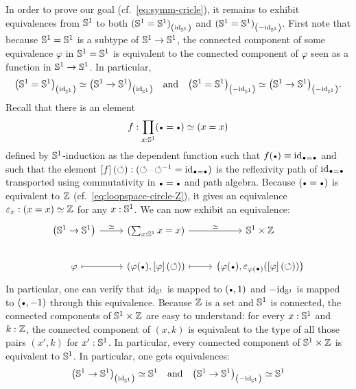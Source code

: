\documentclass[english,a4]{article}
\renewcommand{\ap}[1]{\left[{#1}\right]}
\begin{document}
In order to prove our goal (cf.~\cref{eq:symm-cricle}), it remains to
exhibit equivalences from ${{\mathbb S^{1}}}$ to both
${({{\mathbb S^{1}}}={{\mathbb S^{1}}})}_{\left(\mathord{\mathrm{id}}_{{\mathbb S^{1}}}\right)}$ and
${({{\mathbb S^{1}}}={{\mathbb S^{1}}})}_{\left(-\mathord{\mathrm{id}}_{{\mathbb S^{1}}}\right)}$. First note that because ${{\mathbb S^{1}}}={{\mathbb S^{1}}}$ is
a subtype of ${{\mathbb S^{1}}}\to{{\mathbb S^{1}}}$, the connected component of some equivalence
$\varphi$ in ${{\mathbb S^{1}}}={{\mathbb S^{1}}}$ is equivalent to the connected component of
$\varphi$ seen as a function in ${{\mathbb S^{1}}} \to {{\mathbb S^{1}}}$. In particular,
\begin{displaymath}
  {\left({{\mathbb S^{1}}}={{\mathbb S^{1}}}\right)}_{\left(\mathord{\mathrm{id}}_{{\mathbb S^{1}}}\right)} \simeq {\left({{\mathbb S^{1}}}\to{{\mathbb S^{1}}}\right)}_{\left(\mathord{\mathrm{id}}_{{\mathbb S^{1}}}\right)}
  \quad\text{and}\quad
  {\left({{\mathbb S^{1}}}={{\mathbb S^{1}}}\right)}_{\left(-\mathord{\mathrm{id}}_{{\mathbb S^{1}}}\right)} \simeq {\left({{\mathbb S^{1}}}\to{{\mathbb S^{1}}}\right)}_{\left(-\mathord{\mathrm{id}}_{{\mathbb S^{1}}}\right)}.
\end{displaymath}
Recall that there is an element
\begin{equation}
  \label{eq:S1-loopspace-Z-at-each-x}%
  f\from \prod_{x:\Sc} (\base=\base) \weq (x=x)
\end{equation}
defined by
${{\mathbb S^{1}}}$-induction as the dependent function such that
$f(\base) \jdeq \id_{\base=\base}$ and such that the element
$\ap f (\Sloop) \from (\Sloop\blank\inv\Sloop = \id_{\base=\base})$ is
the reflexivity path of $\id_{\base=\base}$ transported using
commutativity in $\base=\base$ and path algebra. 
Because $(\base=\base)$ is equivalent
to $\mathbb{Z}$ (cf.~\cref{eq:loopspace-circle-Z}), it gives an equivalence
$\varepsilon_x: (x=x) \simeq \mathbb{Z}$ for any $x:{{\mathbb S^{1}}}$. We can now
exhibit an equivalence:
\begin{displaymath}
  \begin{tikzcd}
    \left(\Sc \to \Sc\right) \rar["\weq"] & (\sum_{x\from\Sc}x=x)
    \rar["\weq"] & \Sc \times \ZZ
    \\
    \varphi \rar[mapsto] & (\varphi(\base),\ap \varphi (\Sloop))
    \rar[mapsto] & \left(%
      \varphi(\base), \varepsilon_{\varphi(\base)}(\ap\varphi(\Sloop))%
    \right)%
\end{tikzcd}
\end{displaymath}
In particular, one can verify that $\mathord{\mathrm{id}}_{{\mathbb S^{1}}}$ is mapped to $(\base,1)$
and $-\mathord{\mathrm{id}}_{{\mathbb S^{1}}}$ is mapped to $(\base,-1)$ through this
equivalence. Because $\mathbb{Z}$ is a set and ${{\mathbb S^{1}}}$ is connected, the
connected components of ${{\mathbb S^{1}}}\times\mathbb{Z}$ are easy to understand: for
every $x:{{\mathbb S^{1}}}$ and $k:\mathbb{Z}$, the connected component of $(x,k)$ is
equivalent to the type of all those pairs $(x',k)$ for
$x':{{\mathbb S^{1}}}$. In particular, every connected component of
${{\mathbb S^{1}}}\times\mathbb{Z}$ is equivalent to ${{\mathbb S^{1}}}$. In particular, one gets
equivalences:
\begin{displaymath}
  {\left({{\mathbb S^{1}}}\to {{\mathbb S^{1}}}\right)}_{\left(\mathord{\mathrm{id}}_{{\mathbb S^{1}}}\right)} \simeq {{\mathbb S^{1}}}
  \quad\text{and}\quad
  {\left({{\mathbb S^{1}}}\to {{\mathbb S^{1}}}\right)}_{\left(-\mathord{\mathrm{id}}_{{\mathbb S^{1}}}\right)} \simeq {{\mathbb S^{1}}}
\end{displaymath}
\end{document}
